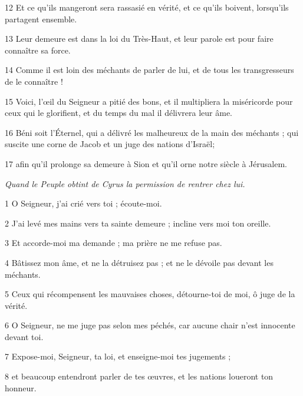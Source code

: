 \par 12 Et ce qu'ils mangeront sera rassasié en vérité, et ce qu'ils boivent, lorsqu'ils partagent ensemble.

\par 13 Leur demeure est dans la loi du Très-Haut, et leur parole est pour faire connaître sa force.

\par 14 Comme il est loin des méchants de parler de lui, et de tous les transgresseurs de le connaître !

\par 15 Voici, l'œil du Seigneur a pitié des bons, et il multipliera la miséricorde pour ceux qui le glorifient, et du temps du mal il délivrera leur âme.

\par 16 Béni soit l'Éternel, qui a délivré les malheureux de la main des méchants ; qui suscite une corne de Jacob et un juge des nations d'Israël;

\par 17 afin qu'il prolonge sa demeure à Sion et qu'il orne notre siècle à Jérusalem.


\par \textit{Quand le Peuple obtint de Cyrus la permission de rentrer chez lui.}

\par 1 O Seigneur, j'ai crié vers toi ; écoute-moi.

\par 2 J'ai levé mes mains vers ta sainte demeure ; incline vers moi ton oreille.

\par 3 Et accorde-moi ma demande ; ma prière ne me refuse pas.

\par 4 Bâtissez mon âme, et ne la détruisez pas ; et ne le dévoile pas devant les méchants.

\par 5 Ceux qui récompensent les mauvaises choses, détourne-toi de moi, ô juge de la vérité.

\par 6 O Seigneur, ne me juge pas selon mes péchés, car aucune chair n'est innocente devant toi.

\par 7 Expose-moi, Seigneur, ta loi, et enseigne-moi tes jugements ;

\par 8 et beaucoup entendront parler de tes œuvres, et les nations loueront ton honneur.

